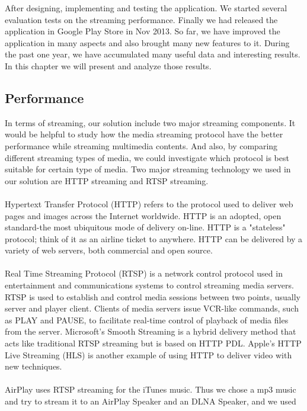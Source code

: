 
After designing, implementing and testing the application. We started several
evaluation tests on the streaming performance. Finally we had released the
application in Google Play Store in Nov 2013. So far, we have improved the
application in many aspects and also brought many new features to it. During
the past one year, we have accumulated many useful data and interesting
results. In this chapter we will present and analyze those results.

\subsection{Performance}
In terms of streaming, our solution include two major streaming components. It
would be helpful to study how the media streaming protocol have the better 
performance while streaming multimedia contents. And also, by comparing
different streaming types of media, we could investigate which protocol is best
suitable for certain type of media. Two major streaming technology we
used in our solution are HTTP streaming and RTSP streaming.\\
\\
Hypertext Transfer Protocol (HTTP) refers to the protocol used to deliver web
pages and images across the Internet worldwide. HTTP is an adopted, open
standard-the most ubiquitous mode of delivery on-line. HTTP is a "stateless"
protocol; think of it as an airline ticket to anywhere. HTTP can be delivered
by a variety of web servers, both commercial and open source.\\
\\
Real Time Streaming Protocol (RTSP) is a network control protocol used in
entertainment and communications systems to control streaming media servers.
RTSP is used to establish and control media sessions between two points,
usually server and player client. Clients of media servers issue VCR-like
commands, such as PLAY and PAUSE, to facilitate real-time control of playback
of media files from the server. Microsoft's Smooth Streaming is a hybrid
delivery method that acts like traditional RTSP streaming but is based on HTTP
PDL. Apple's HTTP Live Streaming (HLS) is another example of using HTTP to
deliver video with new techniques.\\
\\
AirPlay uses RTSP streaming for the iTunes music. Thus we chose a mp3 music and
try to stream it to an AirPlay Speaker and an DLNA Speaker, and we used
